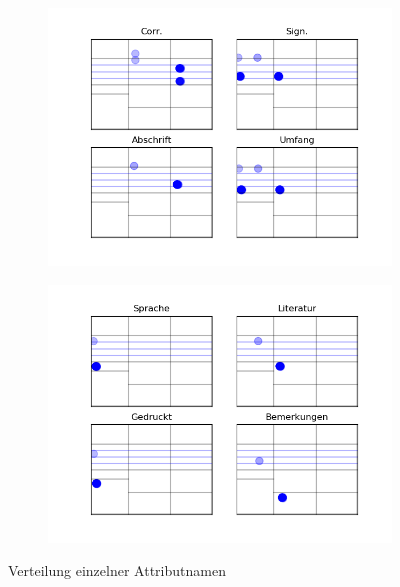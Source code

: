 \begin{figure}[H]
\begin{subfigure}[t]{0.243\textwidth}
		\includegraphics[scale=0.28]{Bilder/attributes_2.png}
	\end{subfigure}
	\begin{subfigure}[t]{0.243\textwidth}
	\centering
		\includegraphics[scale=0.28]{Bilder/attributes_3.png}
	\end{subfigure}
\caption{Verteilung einzelner Attributnamen}
\end{figure}





